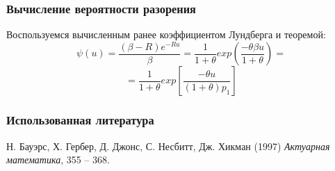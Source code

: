 \documentclass[12pt]{beamer}
\begin{document}
\begin{frame}
\frametitle{Вычисление вероятности разорения}

Воспользуемся вычисленным ранее коэффициентом Лундберга и теоремой:
$$\psi(u) = \frac{(\beta-R)e^{-Ru}}{\beta} =
\frac{1}{1+\theta} exp\left(\frac{-\theta\beta u}{1+\theta}\right) =$$
$$=\frac{1}{1+\theta} exp\left[\frac{-\theta u}{(1+\theta)p_1}\right]$$

\end{frame}


\begin{frame}
\frametitle{Использованная литература}
\footnotesize{
\begin{thebibliography}{99}
 Н. Бауэрс, Х. Гербер, Д. Джонс, С. Несбитт, Дж. Хикман (1997)
\newblock \emph{Актуарная математика}, 355 -- 368.
\end{thebibliography}
}
\end{frame}
\end{document}
